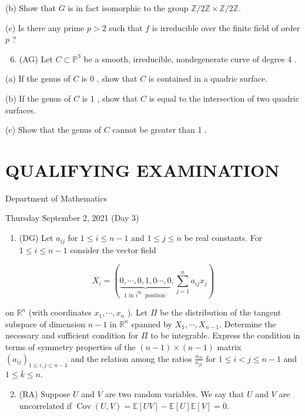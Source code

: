 \documentclass[10pt]{article}
\begin{document}
(b) Show that $G$ is in fact isomorphic to the group $\mathbb{Z} / 2 \mathbb{Z} \times \mathbb{Z} / 2 \mathbb{Z}$.

(c) Is there any prime $p>2$ such that $f$ is irreducible over the finite field of order $p$ ?

\begin{enumerate}
  \setcounter{enumi}{5}
  \item (AG) Let $C \subset \mathbb{P}^{3}$ be a smooth, irreducible, nondegenerate curve of degree 4 .
\end{enumerate}

(a) If the genus of $C$ is 0 , show that $C$ is contained in a quadric surface.

(b) If the genus of $C$ is 1 , show that $C$ is equal to the intersection of two quadric surfaces.

(c) Show that the genus of $C$ cannot be greater than 1 .

\section*{QUALIFYING EXAMINATION }
Department of Mathematics

Thursday September 2, 2021 (Day 3)

\begin{enumerate}
  \item (DG) Let $a_{i j}$ for $1 \leq i \leq n-1$ and $1 \leq j \leq n$ be real constants. For $1 \leq i \leq n-1$ consider the vector field
\end{enumerate}

$$
X_{i}=(\underbrace{0, \cdots, 0,1,0 \cdots, 0}_{1 \text { in } i^{\text {th }} \text { position }}, \sum_{j=1}^{n} a_{i j} x_{j})
$$

on $\mathbb{R}^{n}$ (with coordinates $x_{1}, \cdots, x_{n}$ ). Let $\Pi$ be the distribution of the tangent subspace of dimension $n-1$ in $\mathbb{R}^{n}$ spanned by $X_{1}, \cdots, X_{n-1}$. Determine the necessary and sufficient condition for $\Pi$ to be integrable. Express the condition in terms of symmetry properties of the $(n-1) \times(n-1)$ matrix $\left(a_{i j}\right)_{1 \leq i, j \leq n-1}$ and the relation among the ratios $\frac{a_{i k}}{a_{j k}}$ for $1 \leq i<j \leq n-1$ and $1 \leq \bar{k} \leq n$.

\begin{enumerate}
  \setcounter{enumi}{1}
  \item (RA) Suppose $U$ and $V$ are two random variables. We say that $U$ and $V$ are uncorrelated if $\operatorname{Cov}(U, V)=\mathbb{E}[U V]-\mathbb{E}[U] \mathbb{E}[V]=0$.
\end{enumerate}
\end{document}
